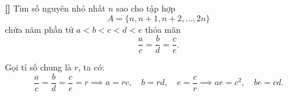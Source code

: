 \documentclass[../04-diophantine-equations.tex]{subfiles}
\begin{document}
\begin{exercise*}\label{example:ROU-2014-MO-G8-P3}\textbf{[]}
    Tìm số nguyên nhỏ nhất \( n \) sao cho tập hợp 
    \[
        A = \{n, n + 1, n + 2, \ldots, 2n\}
    \]
    chứa năm phần tử \( a < b < c < d < e \) thỏa mãn
    \[
        \frac{a}{c} = \frac{b}{d} = \frac{c}{e}.
    \]
\end{exercise*}

\begin{remark*}
    Gọi tỉ số chung là \( r \), ta có:
    \[
        \frac{a}{c} = \frac{b}{d} = \frac{c}{e} = r \implies a = rc,\quad b = rd,\quad e = \frac{c}{r} \implies ae = c^2,\quad be = cd.
    \]
\end{remark*}


\end{document}
